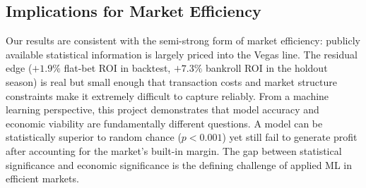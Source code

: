 \documentclass[11pt]{extarticle}
\begin{document}
\subsection{Implications for Market Efficiency}
Our results are consistent with the semi-strong form of market efficiency: publicly available statistical information is
largely priced into the Vegas line. The residual edge ($+1.9\%$ flat-bet ROI in backtest, $+7.3\%$ bankroll ROI in the
holdout season) is real but small enough that transaction costs and market structure constraints make it extremely
difficult to capture reliably. From a machine learning perspective, this project demonstrates that model accuracy and
economic viability are fundamentally different questions. A model can be statistically superior to random chance ($p <0.001$) yet still fail to generate profit after accounting for the market's built-in margin. The gap between statistical
significance and economic significance is the defining challenge of applied ML in efficient markets.
\end{document}
